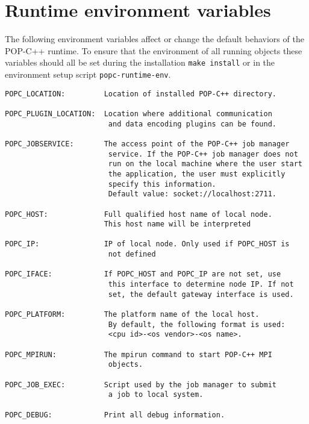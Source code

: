 \chapter{Runtime environment variables}

The following environment variables affect or change the default behaviors of the POP-C++ runtime. To ensure that the environment of all running objects these variables should all be set during the installation \texttt{make install} or in the environment setup script \texttt{popc-runtime-env}.

\begin{verbatim} 
POPC_LOCATION:         Location of installed POP-C++ directory.

POPC_PLUGIN_LOCATION:  Location where additional communication
                        and data encoding plugins can be found. 

POPC_JOBSERVICE:       The access point of the POP-C++ job manager 
                        service. If the POP-C++ job manager does not
                        run on the local machine where the user start 
                        the application, the user must explicitly 
                        specify this information. 
                        Default value: socket://localhost:2711. 

POPC_HOST:             Full qualified host name of local node. 
                       This host name will be interpreted

POPC_IP:               IP of local node. Only used if POPC_HOST is
                        not defined

POPC_IFACE:            If POPC_HOST and POPC_IP are not set, use
                        this interface to determine node IP. If not
                        set, the default gateway interface is used.

POPC_PLATFORM:         The platform name of the local host. 
                        By default, the following format is used:
                        <cpu id>-<os vendor>-<os name>.

POPC_MPIRUN:           The mpirun command to start POP-C++ MPI 
                        objects.

POPC_JOB_EXEC:         Script used by the job manager to submit 
                        a job to local system. 

POPC_DEBUG:            Print all debug information. 

\end{verbatim} 
